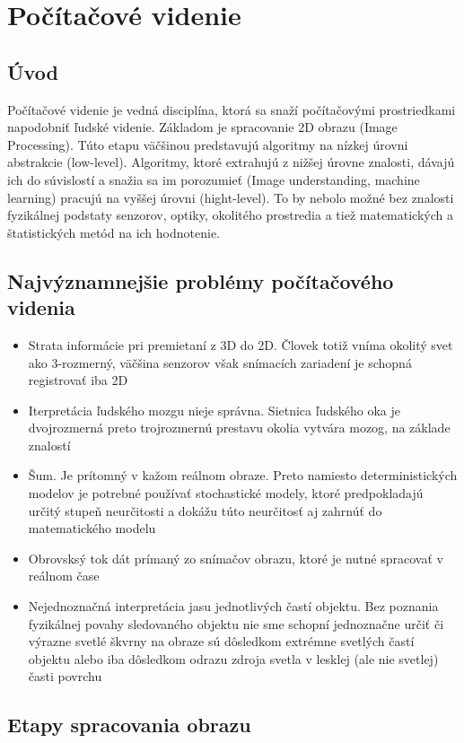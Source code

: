 \chapter{Počítačové videnie}
\section{Úvod}
Počítačové videnie je vedná disciplína, ktorá sa snaží počítačovými prostriedkami napodobniť ľudské videnie. Základom je spracovanie 2D obrazu (Image Processing). Túto etapu väčšinou predstavujú algoritmy na nízkej úrovni abstrakcie (low-level). Algoritmy, ktoré extrahujú z nižšej úrovne znalosti, dávajú ich do súvislostí a snažia sa im porozumieť (Image understanding, machine learning) pracujú na vyššej úrovni (hight-level). To by nebolo možné bez znalosti fyzikálnej podstaty senzorov, optiky, okolitého prostredia a tiež matematických a štatistických metód na ich hodnotenie.

\section{Najvýznamnejšie problémy počítačového videnia}
\begin{itemize}
\item Strata informácie pri premietaní z 3D do 2D. Človek totiž vníma okolitý svet ako 3-rozmerný, väčšina senzorov však snímacích zariadení je schopná registrovať iba 2D
\item Iterpretácia ľudského mozgu nieje správna. Sietnica ľudského oka je dvojrozmerná preto trojrozmernú prestavu okolia vytvára mozog, na základe znalostí
\item Šum. Je prítomný v kažom reálnom obraze. Preto namiesto deterministických modelov je potrebné používať stochastické modely, ktoré predpokladajú určitý stupeň neurčitosti a dokážu túto neurčitosť aj zahrnúť do matematického modelu
\item Obrovsksý tok dát prímaný zo snímačov obrazu, ktoré je nutné spracovať v reálnom čase
\item Nejednoznačná interpretácia jasu jednotlivých častí objektu. Bez poznania fyzikálnej povahy sledovaného objektu nie sme schopní jednoznačne určiť či výrazne svetlé škvrny na obraze sú dôsledkom extrémne svetlých častí objektu alebo iba dôsledkom odrazu zdroja svetla v lesklej (ale nie svetlej) časti povrchu
\end{itemize}


\section{Etapy spracovania obrazu}

